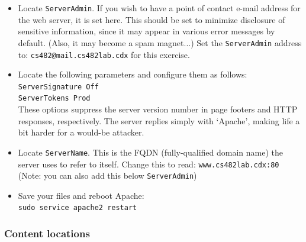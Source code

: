 \documentclass{article}
\begin{document}
\begin{itemize}
\item Locate {\tt ServerAdmin}. If you wish to have a point of contact e-mail address for the web server, it is set here. This should be set to minimize disclosure of sensitive information, since it may appear in various error messages by default. (Also, it may become a spam magnet...) Set the {\tt ServerAdmin} address to: {\tt cs482@mail.cs482lab.cdx} for this exercise.  
	
\item Locate the following parameters and configure them as follows:\\
{\tt ServerSignature Off } \\
{\tt 	ServerTokens Prod } \\
These options suppress the server version number in page footers and HTTP responses, respectively. The server replies simply with `Apache', making life a bit harder for a would-be attacker.

\item Locate {\tt ServerName}. This is the FQDN (fully-qualified domain name) the server uses to refer to itself. Change this to read: {\tt www.cs482lab.cdx:80 } (Note: you can also add this below {\tt ServerAdmin})


\item Save your files and reboot Apache:\\
{\tt sudo service apache2 restart}


\end{itemize}


\subsubsection{Content locations}
\end{document}
